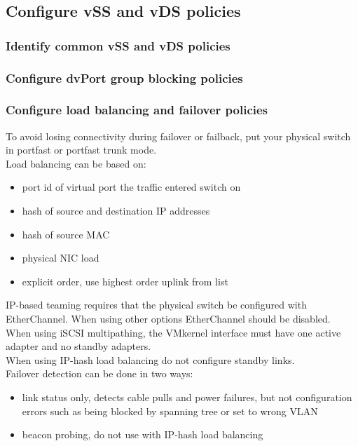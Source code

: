 \subsection{Configure vSS and vDS policies}

\subsubsection{Identify common vSS and vDS policies}

\subsubsection{Configure dvPort group blocking policies}

\subsubsection{Configure load balancing and failover policies}

To avoid losing connectivity during failover or failback, put your physical
switch in portfast or portfast trunk mode.\\

Load balancing can be based on:

\begin{itemize}
\item port id of virtual port the traffic entered switch on
\item hash of source and destination IP addresses
\item hash of source MAC
\item physical NIC load
\item explicit order, use highest order uplink from list
\end{itemize}

IP-based teaming requires that the physical switch be configured with
EtherChannel. When using other options EtherChannel should be disabled.\\

When using iSCSI multipathing, the VMkernel interface must have one active
adapter and no standby adapters.\\

When using IP-hash load balancing do not configure standby links.\\

Failover detection can be done in two ways:

\begin{itemize}

\item link status only, detects cable pulls and power failures, but not
configuration errors such as being blocked by spanning tree or set to wrong
VLAN

\item beacon probing, do not use with IP-hash load balancing

\end{itemize}

